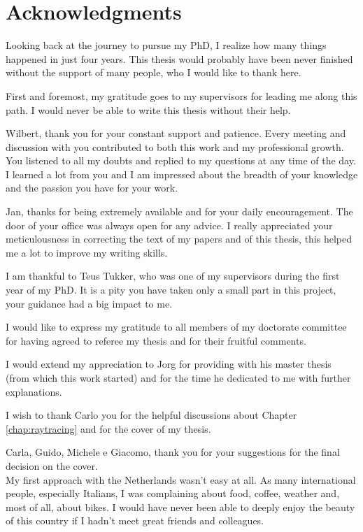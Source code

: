
\chapter*{Acknowledgments}
\markboth{}{}
Looking back at the journey to pursue my PhD, I realize how many things happened in just four years. This thesis would probably have been never finished without the support of many people, who I would like to thank here.  

First and foremost, my gratitude goes to my supervisors for leading me along this path. I would never be able to write this thesis without their help.

Wilbert, thank you for your constant support and patience. Every meeting and discussion with you contributed to both this work and my professional growth. 
You listened to all my doubts and replied to my questions at any time of the day.
I learned a lot from you and I am impressed about the breadth of your knowledge and the passion you have for your work. 

Jan, thanks for being extremely available and for your daily encouragement. The door of your office was always open for any advice. 
I really appreciated your meticulousness in correcting the text of my papers and of this thesis, this helped me a lot to improve my writing skills.

I am thankful to Teus Tukker, who was one of my supervisors during the first year of my PhD. It is a pity you have taken only a small part in this project, your guidance had a big impact to me.

I would like to express my gratitude to all members of my doctorate committee for having agreed to referee my thesis and for their fruitful comments.  

I would extend my appreciation to Jorg for providing with his master thesis (from which this work started) and for the time he dedicated to me with further explanations.

I wish to thank Carlo you for the helpful discussions about Chapter \ref{chap:raytracing} and for the cover of my thesis. 

Carla, Guido, Michele e Giacomo, thank you for your suggestions for the final decision on the cover. \\

My first approach with the Netherlands wasn't easy at all. As many international people, especially Italians, I was complaining about food, coffee, weather and, most of all, about bikes. 
I would have never been able to deeply enjoy the beauty of this country if I hadn't meet great friends and colleagues.

